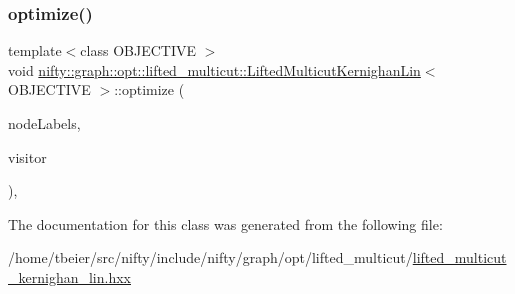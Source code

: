 \subsubsection{\texorpdfstring{optimize()}{optimize()}}
{\footnotesize\ttfamily template$<$class O\+B\+J\+E\+C\+T\+I\+VE $>$ \\
void \hyperlink{classnifty_1_1graph_1_1opt_1_1lifted__multicut_1_1LiftedMulticutKernighanLin}{nifty\+::graph\+::opt\+::lifted\+\_\+multicut\+::\+Lifted\+Multicut\+Kernighan\+Lin}$<$ O\+B\+J\+E\+C\+T\+I\+VE $>$\+::optimize (\begin{DoxyParamCaption}\item[{\hyperlink{classnifty_1_1graph_1_1opt_1_1lifted__multicut_1_1LiftedMulticutKernighanLin_aac39b263efe0f990f6bf6989babec8a4}{Node\+Labels\+Type} \&}]{node\+Labels,  }\item[{\hyperlink{classnifty_1_1graph_1_1opt_1_1lifted__multicut_1_1LiftedMulticutKernighanLin_a3c55dddb71a3b4dabe10de599ff330eb}{Visitor\+Base\+Type} $\ast$}]{visitor }\end{DoxyParamCaption})\hspace{0.3cm}{\ttfamily [inline]}, {\ttfamily [virtual]}}



The documentation for this class was generated from the following file\+:\begin{DoxyCompactItemize}
\item 
/home/tbeier/src/nifty/include/nifty/graph/opt/lifted\+\_\+multicut/\hyperlink{lifted__multicut__kernighan__lin_8hxx}{lifted\+\_\+multicut\+\_\+kernighan\+\_\+lin.\+hxx}\end{DoxyCompactItemize}
